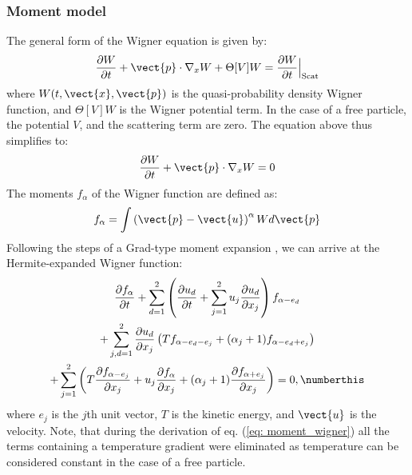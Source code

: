 \subsubsection{Moment model}
The general form of the Wigner equation \cite{base} is given by:
\begin{gather}
    \frac{\partial W}{\partial t} + \vect{p} \cdot \nabla_x W + \Theta[V]W = \frac{\partial W}{\partial t}\Bigr |_{\text{Scat}}
\end{gather}
where $W(t, \vect{x}, \vect{p})$ is the quasi-probability density Wigner function, and $\Theta[V]W$ is the Wigner potential term. In the case of a free particle, the potential $V$, and the scattering term are zero. The equation above thus simplifies to:
\begin{gather}
    \frac{\partial W}{\partial t} + \vect{p} \cdot \nabla_x W = 0 \label{eq: wigner_free}
\end{gather}
The moments $f_\alpha$ of the Wigner function are defined as:
\begin{gather}
    f_\alpha = \int \left(\vect{p}-\vect{u}\right)^\alpha W d\vect{p}
\end{gather}
Following the steps of a Grad-type moment expansion \cite{base}, we can arrive at the Hermite-expanded Wigner function:
\begin{gather*}
    \frac{\partial f_{\alpha}}{\partial t} + \sum_{d=1}^{2} \left( \frac{\partial u_d}{\partial t} + \sum_{j=1}^{2} u_j \frac{\partial u_d}{\partial x_j} \right) f_{\alpha - e_d} \\
    + \sum_{j,d=1}^{2} \frac{\partial u_d}{\partial x_j} \left( T f_{\alpha - e_d - e_j} + (\alpha_j + 1) f_{\alpha - e_d + e_j} \right) \\
    + \sum_{j=1}^{2} \left( T \frac{\partial f_{\alpha - e_j}}{\partial x_j} + u_j \frac{\partial f_{\alpha}}{\partial x_j} + (\alpha_j + 1) \frac{\partial f_{\alpha + e_j}}{\partial x_j} \right)
    = 0, \numberthis \label{eq: moment_wigner}
\end{gather*}
where $e_j$ is the $j$th unit vector, $T$ is the kinetic energy, and $\vect{u}$ is the velocity. Note, that during the derivation of eq. (\ref{eq: moment_wigner}) all the terms containing a temperature gradient were eliminated as temperature can be considered constant in the case of a free particle. 

